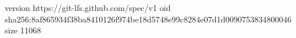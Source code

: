 version https://git-lfs.github.com/spec/v1
oid sha256:8af865934f38ba8410126f974be18d5748e99c8284e07d1d0090753834800046
size 11068

